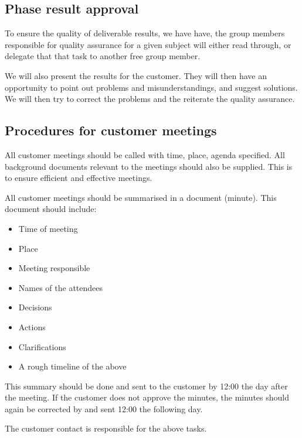 \subsection{Phase result approval}
To ensure the quality of deliverable results, we have have, the group members responsible for quality assurance for a given subject will either read through, or delegate that that task to another free group member.

We will also present the results for the customer. They will then have an opportunity to point out problems and misunderstandings, and suggest solutions. We will then try to correct the problems and the reiterate the quality assurance.

\subsection{Procedures for customer meetings}
All customer meetings should be called with time, place, agenda specified. All background documents relevant to the meetings should also be supplied. This is to ensure efficient and effective meetings.

All customer meetings should be summarised in a document (minute). This document should include:
\begin{itemize}
	\item Time of meeting
	\item Place
	\item Meeting responsible
	\item Names of the attendees
	\item Decisions
	\item Actions
	\item Clarifications
	\item A rough timeline of the above
\end{itemize}

This summary should be done and sent to the customer by 12:00 the day after the meeting. If the customer does not approve the minutes, the minutes should again be corrected by and sent 12:00 the following day.

The customer contact is responsible for the above tasks.

